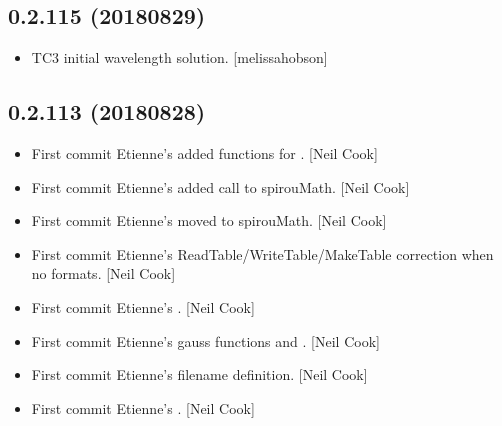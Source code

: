 \documentclass[a4paper,10pt,english]{report}
\begin{document}
\subsection{0.2.115 (2018\sphinxhyphen{}08\sphinxhyphen{}29)}
\label{\detokenize{misc/changelog:id366}}\begin{itemize}
\item {} 
TC3 initial wavelength solution. {[}melissa\sphinxhyphen{}hobson{]}

\end{itemize}


\subsection{0.2.113 (2018\sphinxhyphen{}08\sphinxhyphen{}28)}
\label{\detokenize{misc/changelog:id367}}\begin{itemize}
\item {} 
First commit \sphinxhyphen{} Etienne’s  \sphinxhyphen{} added functions for . {[}Neil
Cook{]}

\item {} 
First commit \sphinxhyphen{} Etienne’s  \sphinxhyphen{} added call to spirouMath. {[}Neil
Cook{]}

\item {} 
First commit \sphinxhyphen{} Etienne’s  \sphinxhyphen{} moved  to spirouMath. {[}Neil
Cook{]}

\item {} 
First commit \sphinxhyphen{} Etienne’s  \sphinxhyphen{} ReadTable/WriteTable/MakeTable
correction when no formats. {[}Neil Cook{]}

\item {} 
First commit \sphinxhyphen{} Etienne’s  \sphinxhyphen{} . {[}Neil Cook{]}

\item {} 
First commit \sphinxhyphen{} Etienne’s  \sphinxhyphen{} gauss functions and . {[}Neil
Cook{]}

\item {} 
First commit \sphinxhyphen{} Etienne’s  \sphinxhyphen{} filename definition. {[}Neil Cook{]}

\item {} 
First commit \sphinxhyphen{} Etienne’s . {[}Neil Cook{]}


\end{itemize}
\end{document}
